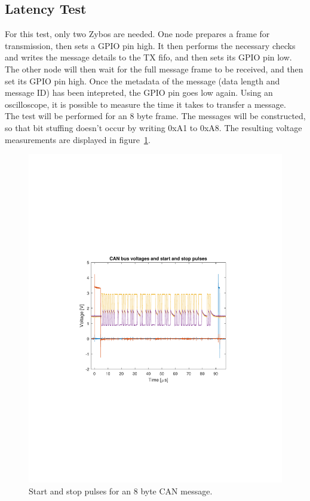 \subsection{Latency Test}\label{sub:CAN_latency}
For this test, only two Zybos are needed.
One node prepares a frame for transmission, then sets a GPIO pin high.
It then performs the necessary checks and writes the message details to the TX fifo, and then sets its GPIO pin low. \\

The other node will then wait for the full message frame to be received, and then set its GPIO pin high.
Once the metadata of the message (data length and message ID) has been intepreted, the GPIO pin goes low again.
Using an oscilloscope, it is possible to measure the time it takes to transfer a message.\\

The test will be performed for an 8 byte frame.
The messages will be constructed, so that bit stuffing doesn't occur by writing 0xA1 to 0xA8. 
The resulting voltage measurements are displayed in figure~\ref{fig:CAN_test1_raw}.\\

\begin{figure}[h]
	\centering
	\includegraphics[width = \linewidth]{graphics/CAN_test1_raw}
	\caption{Start and stop pulses for an 8 byte CAN message. }
	\label{fig:CAN_test1_raw}
\end{figure}

